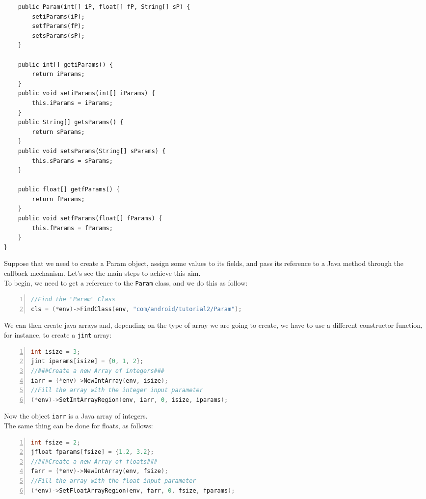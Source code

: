 \documentclass[a4paper,10pt]{article}
\newcommand{\keyword}[1]{\texttt{#1}}
\begin{document}
\begin{multicols}{2}
\begin{lstlisting}
	public Param(int[] iP, float[] fP, String[] sP) {
		setiParams(iP);
		setfParams(fP);
		setsParams(sP);
	}

	public int[] getiParams() {
		return iParams;
	}
	public void setiParams(int[] iParams) {
		this.iParams = iParams;
	}
	public String[] getsParams() {
		return sParams;
	}
	public void setsParams(String[] sParams) {
		this.sParams = sParams;
	}

	public float[] getfParams() {
		return fParams;
	}
	public void setfParams(float[] fParams) {
		this.fParams = fParams;
	}
}
\end{lstlisting}
Suppose that we need to create a Param object, assign some values to its fields,
and pass its reference to a Java method through the callback mechanism. Let's
see the main steps to achieve this aim.\\
To begin, we need to get a reference to the \keyword{Param} class, and we do
this as follow:
\begin{lstlisting}[language=C,
		   columns=fullflexible,
		   showstringspaces=false,
		   xleftmargin=15pt,
		   frame = l,
		   numbers=left,
		   commentstyle=\color{gray}\upshape]
//Find the "Param" Class
cls = (*env)->FindClass(env, "com/android/tutorial2/Param");
\end{lstlisting}
We can then create java arrays and, depending on the type of array we are going
to create, we have to use a different constructor function, for instance, to
create a \keyword{jint} array:
\begin{lstlisting}[language=C,
		   columns=fullflexible,
		   showstringspaces=false,
		   xleftmargin=15pt,
		   frame = l,
		   numbers=left,
		   commentstyle=\color{gray}\upshape]
int isize = 3;
jint iparams[isize] = {0, 1, 2};
//###Create a new Array of integers###
iarr = (*env)->NewIntArray(env, isize);
//Fill the array with the integer input parameter
(*env)->SetIntArrayRegion(env, iarr, 0, isize, iparams);
\end{lstlisting}
Now the object \keyword{iarr} is a Java array of integers.\\
The same thing can be done for floats, as follows:
\begin{lstlisting}[language=C,
		   columns=fullflexible,
		   showstringspaces=false,
		   xleftmargin=15pt,
		   frame = l,
		   numbers=left,
		   commentstyle=\color{gray}\upshape]
int fsize = 2;
jfloat fparams[fsize] = {1.2, 3.2};
//###Create a new Array of floats###
farr = (*env)->NewIntArray(env, fsize);
//Fill the array with the float input parameter
(*env)->SetFloatArrayRegion(env, farr, 0, fsize, fparams);

\end{lstlisting}
\end{multicols}
\end{document}
